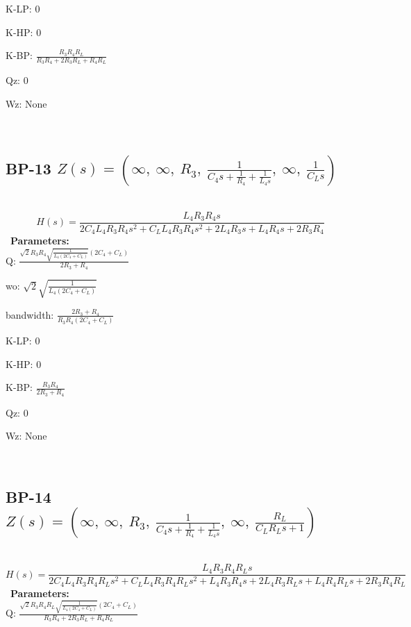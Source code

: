 \documentclass{article}
\begin{document}
K-LP: $0$\ 

K-HP: $0$\ 

K-BP: $\frac{R_{3} R_{4} R_{L}}{R_{3} R_{4} + 2 R_{3} R_{L} + R_{4} R_{L}}$\ 

Qz: $0$\ 

Wz: $\text{None}$\ 

\ 

\subsection{BP-13 $Z(s) = \left( \infty, \  \infty, \  R_{3}, \  \frac{1}{C_{4} s + \frac{1}{R_{4}} + \frac{1}{L_{4} s}}, \  \infty, \  \frac{1}{C_{L} s}\right)$ } \ 
\textbf{\[H(s) = \frac{L_{4} R_{3} R_{4} s}{2 C_{4} L_{4} R_{3} R_{4} s^{2} + C_{L} L_{4} R_{3} R_{4} s^{2} + 2 L_{4} R_{3} s + L_{4} R_{4} s + 2 R_{3} R_{4}}\] } \ 
\textbf{Parameters:}\\ 

Q: $\frac{\sqrt{2} R_{3} R_{4} \sqrt{\frac{1}{L_{4} \left(2 C_{4} + C_{L}\right)}} \left(2 C_{4} + C_{L}\right)}{2 R_{3} + R_{4}}$\ 

wo: $\sqrt{2} \sqrt{\frac{1}{L_{4} \left(2 C_{4} + C_{L}\right)}}$\ 

bandwidth: $\frac{2 R_{3} + R_{4}}{R_{3} R_{4} \left(2 C_{4} + C_{L}\right)}$\ 

K-LP: $0$\ 

K-HP: $0$\ 

K-BP: $\frac{R_{3} R_{4}}{2 R_{3} + R_{4}}$\ 

Qz: $0$\ 

Wz: $\text{None}$\ 

\ 

\subsection{BP-14 $Z(s) = \left( \infty, \  \infty, \  R_{3}, \  \frac{1}{C_{4} s + \frac{1}{R_{4}} + \frac{1}{L_{4} s}}, \  \infty, \  \frac{R_{L}}{C_{L} R_{L} s + 1}\right)$ } \ 
\textbf{\[H(s) = \frac{L_{4} R_{3} R_{4} R_{L} s}{2 C_{4} L_{4} R_{3} R_{4} R_{L} s^{2} + C_{L} L_{4} R_{3} R_{4} R_{L} s^{2} + L_{4} R_{3} R_{4} s + 2 L_{4} R_{3} R_{L} s + L_{4} R_{4} R_{L} s + 2 R_{3} R_{4} R_{L}}\] } \ 
\textbf{Parameters:}\\ 

Q: $\frac{\sqrt{2} R_{3} R_{4} R_{L} \sqrt{\frac{1}{L_{4} \left(2 C_{4} + C_{L}\right)}} \left(2 C_{4} + C_{L}\right)}{R_{3} R_{4} + 2 R_{3} R_{L} + R_{4} R_{L}}$\ 
\end{document}
